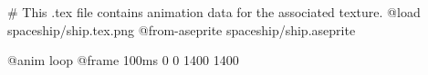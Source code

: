 # This .tex file contains animation data for the associated texture.
@load spaceship/ship.tex.png
@from-aseprite spaceship/ship.aseprite

@anim loop
	@frame 100ms 0 0 1400 1400
